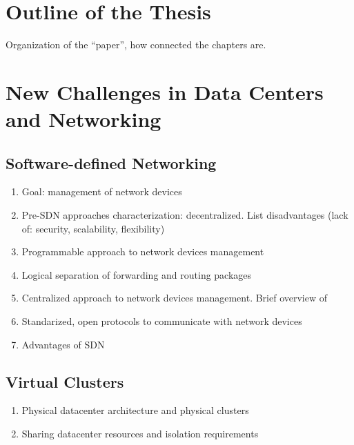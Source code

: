 \section{Outline of the Thesis}


Organization of the ``paper'', how connected the chapters are.

\section{New Challenges in Data Centers and Networking}

\subsection{Software-defined Networking}

\begin{enumerate}
  \item Goal: management of network devices
  \item Pre-SDN approaches characterization: decentralized. List disadvantages (lack of: security, scalability, flexibility)
  \item Programmable approach to network devices management
  \item Logical separation of forwarding and routing packages
  \item Centralized approach to network devices management. Brief overview of 
  \item Standarized, open protocols to communicate with network devices
  \item Advantages of SDN
\end{enumerate}


\subsection{Virtual Clusters}

\begin{enumerate}
  \item Physical datacenter architecture and physical clusters
  \item Sharing datacenter resources and isolation requirements
\end{enumerate}

